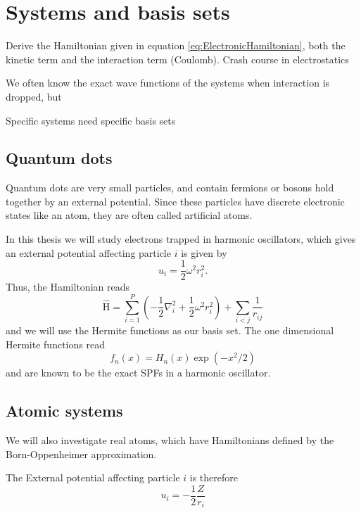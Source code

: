 \chapter{Systems and basis sets} \label{chp:potentials}
Derive the Hamiltonian given in equation \eqref{eq:ElectronicHamiltonian}, both the kinetic term and the interaction term (Coulomb). Crash course in electrostatics 

We often know the exact wave functions of the systems when interaction is dropped, but 

Specific systems need specific basis sets

\section{Quantum dots} \label{subsubsec:quantumdots}
Quantum dots are very small particles, and contain fermions or bosons hold together by an external potential. Since these particles have discrete electronic states like an atom, they are often called artificial atoms. 

In this thesis we will study electrons trapped in harmonic oscillators, which gives an external potential affecting particle $i$ is given by
\begin{equation}
u_i=\frac{1}{2}\omega^2r_i^2.
\end{equation}
Thus, the Hamiltonian reads
\begin{equation}
\label{eq:HOHamiltonian}
\hat{\text{H}} = \sum_{i=1}^{P} (-\frac{1}{2} \nabla_i^2 + \frac{1}{2} \omega^2 r_i ^2) + \sum_{i<j} \frac{1}{r_{ij}} 
\end{equation}
and we will use the Hermite functions as our basis set. The one dimensional Hermite functions read
\begin{equation}
f_n(x)=H_n(x)\exp(-x^2/2)
\end{equation}
and are known to be the exact SPFs in a harmonic oscillator. 

\section{Atomic systems} \label{subsubsec:atomic}
We will also investigate real atoms, which have Hamiltonians defined by the Born-Oppenheimer approximation.

The External potential affecting particle $i$ is therefore
\begin{equation}
u_i=- \frac{1}{2} \frac{Z}{r_i}
\end{equation}



